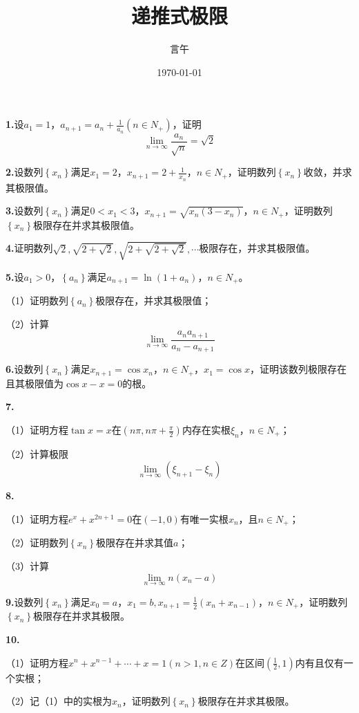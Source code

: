 \documentclass[10pt]{article}
\title{递推式极限}
\author{言午}
\date{\today}
\begin{document}
	\maketitle
	
	\textbf{1.}设$a_1=1$，$a_{n+1}=a_n+\frac{1}{a_n}\left( n\in N_+ \right)$，证明
	$$
	\lim_{n\rightarrow \infty} \frac{a_n}{\sqrt{n}}=\sqrt{2}
	$$
	
	\textbf{2.}设数列$\left\{ x_n \right\}$满足$x_1=2$，$x_{n+1}=2+\frac{1}{x_n}$，$n\in N_+$，证明数列$\left\{ x_n \right\}$收敛，并求其极限值。
	
	\textbf{3.}设数列$\left\{ x_n \right\}$满足$0<x_1<3$，$x_{n+1}=\sqrt{x_n\left( 3-x_n \right)}$，$n\in N_+$，证明数列$\left\{ x_n \right\}$极限存在并求其极限值。
	
	\textbf{4.}证明数列$\sqrt{2},\sqrt{2+\sqrt{2}},\sqrt{2+\sqrt{2+\sqrt{2}}},\cdots$极限存在，并求其极限值。
	
	\textbf{5.}设$a_1>0$，$\left\{ a_n \right\}$满足$a_{n+1}=\ln \left( 1+a_n \right)$，$n\in N_+$。
	
	（1）证明数列$\left\{ a_n \right\}$极限存在，并求其极限值；
	
	（2）计算
	$$
	\lim_{n\rightarrow \infty} \frac{a_na_{n+1}}{a_n-a_{n+1}}
	$$
	
	\textbf{6.}设数列$\left\{ x_n \right\}$满足$x_{n+1}=\cos x_n$，$n\in N_+$，$x_1=\cos x$，证明该数列极限存在且其极限值为$\cos x-x=0$的根。
	
	\textbf{7.}
	
	（1）证明方程$\tan x=x$在$\left( n\pi ,n\pi +\frac{\pi}{2} \right)$内存在实根$\xi _n$，$n\in N_+$；
	
	（2）计算极限
	$$
	\lim_{n\rightarrow \infty} \left( \xi_{n+1}-\xi _n \right)
	$$
	
	\textbf{8.}
	
	（1）证明方程$e^x+x^{2n+1}=0$在$\left( -1,0 \right)$有唯一实根$x_n$，且$n\in N_+$；
	
	（2）证明数列$\left\{ x_n \right\}$极限存在并求其值$a$；
	
	（3）计算
	$$
	\lim_{n\rightarrow \infty} n\left( x_n-a \right)
	$$
	
	\textbf{9.}设数列$\left\{ x_n \right\}$满足$x_0=a$，$x_1=b,x_{n+1}=\frac{1}{2}\left( x_n+x_{n-1} \right)$，$n\in N_+$，证明数列$\left\{ x_n \right\}$极限存在并求其极限。
	
	\textbf{10.}
	
	（1）证明方程$x^n+x^{n-1}+\cdots +x=1\left( n>1,n\in Z \right)$在区间$\left( \frac{1}{2},1 \right)$内有且仅有一个实根；
	
	（2）记（1）中的实根为$x_n$，证明数列$\left\{ x_n \right\}$极限存在并求其极限。
\end{document}
